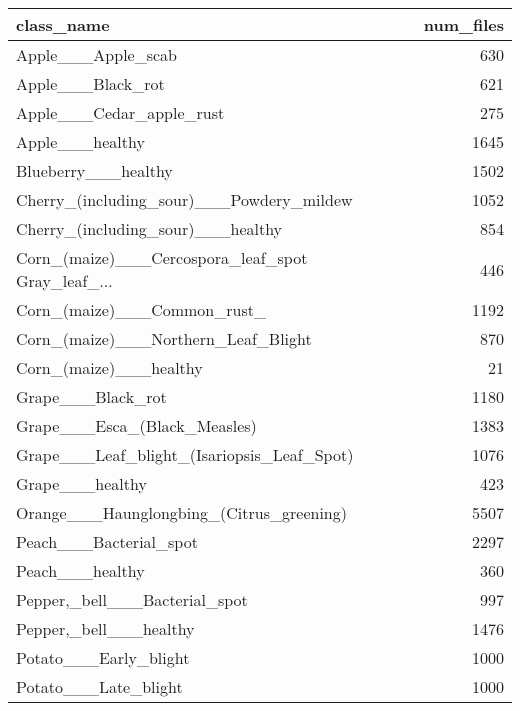 \begin{tabular}{lr}
\toprule
                                        class\_name &  num\_files \\
\midrule
                                Apple\_\_\_Apple\_scab &        630 \\
                                 Apple\_\_\_Black\_rot &        621 \\
                          Apple\_\_\_Cedar\_apple\_rust &        275 \\
                                   Apple\_\_\_healthy &       1645 \\
                               Blueberry\_\_\_healthy &       1502 \\
          Cherry\_(including\_sour)\_\_\_Powdery\_mildew &       1052 \\
                 Cherry\_(including\_sour)\_\_\_healthy &        854 \\
 Corn\_(maize)\_\_\_Cercospora\_leaf\_spot Gray\_leaf\_... &        446 \\
                       Corn\_(maize)\_\_\_Common\_rust\_ &       1192 \\
               Corn\_(maize)\_\_\_Northern\_Leaf\_Blight &        870 \\
                            Corn\_(maize)\_\_\_healthy &         21 \\
                                 Grape\_\_\_Black\_rot &       1180 \\
                      Grape\_\_\_Esca\_(Black\_Measles) &       1383 \\
        Grape\_\_\_Leaf\_blight\_(Isariopsis\_Leaf\_Spot) &       1076 \\
                                   Grape\_\_\_healthy &        423 \\
          Orange\_\_\_Haunglongbing\_(Citrus\_greening) &       5507 \\
                            Peach\_\_\_Bacterial\_spot &       2297 \\
                                   Peach\_\_\_healthy &        360 \\
                     Pepper,\_bell\_\_\_Bacterial\_spot &        997 \\
                            Pepper,\_bell\_\_\_healthy &       1476 \\
                             Potato\_\_\_Early\_blight &       1000 \\
                              Potato\_\_\_Late\_blight &       1000 \\

\end{tabular}
